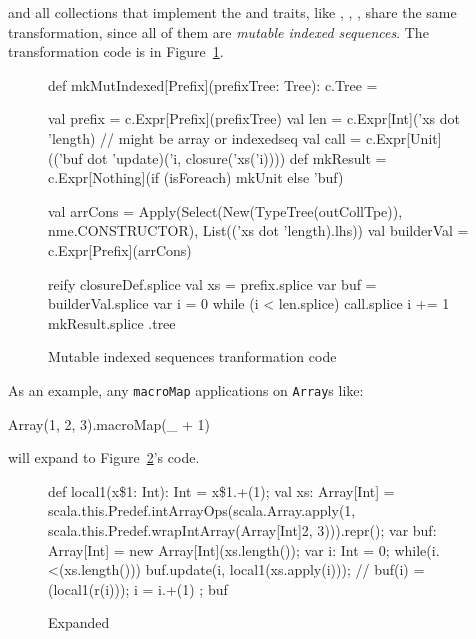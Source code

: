  and all collections that implement the 
 and 
traits, like ,
 , 
,
share the same transformation, since all of them are \emph{mutable indexed
sequences}. The transformation code is in Figure~\ref{mut_ind_transf}.

\begin{figure}
\begin{scalaCode}
def mkMutIndexed[Prefix](prefixTree: Tree): c.Tree = {
  val prefix   = c.Expr[Prefix](prefixTree)
  val len      = c.Expr[Int]('xs dot 'length) // might be array or indexedseq
  val call     = c.Expr[Unit](('buf dot 'update)('i, closure('xs('i))))
  def mkResult = c.Expr[Nothing](if (isForeach) mkUnit else 'buf)

  val arrCons  =   Apply(Select(New(TypeTree(outCollTpe)), nme.CONSTRUCTOR), List(('xs dot 'length).lhs))
  val builderVal = c.Expr[Prefix](arrCons)
  
  reify {
    closureDef.splice
    val xs = prefix.splice
    var buf = builderVal.splice
    var i  = 0
    while (i < len.splice) {
      call.splice
      i += 1
    }
    mkResult.splice
  }.tree
}
\end{scalaCode}
\caption[Mutable indexed sequences tranformation code]{Mutable indexed sequences tranformation code}
\label{mut_ind_transf}
\end{figure}

As an example, any \texttt{macroMap} applications on \texttt{Array}s like:
\begin{scalaCode}
Array(1, 2, 3).macroMap(\_ + 1)
\end{scalaCode}
will expand to Figure~\ref{array_expansion}'s code.

\begin{figure}
\begin{scalaCode}
{
  def local1(x\$1: Int): Int = x\$1.+(1);
  val xs: Array[Int] = scala.this.Predef.intArrayOps(scala.Array.apply(1,
scala.this.Predef.wrapIntArray(Array[Int]{2, 3}))).repr();
  var buf: Array[Int] = new Array[Int](xs.length());
  var i: Int = 0;
  while(i.<(xs.length())){
    buf.update(i, local1(xs.apply(i))); // buf(i) = (local1(r(i)));
    i = i.+(1)
  };
  buf
}
\end{scalaCode}
\caption[Expanded ]{Expanded }
\label{array_expansion}
\end{figure}

